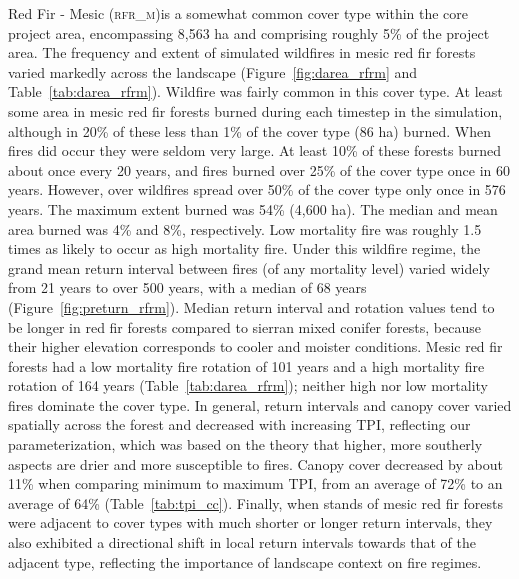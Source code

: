 Red Fir - Mesic (\textsc{rfr\_m})is a somewhat common cover type within the core project area, encompassing 8,563 ha and comprising roughly 5\% of the project area. The frequency and extent of simulated wildfires in mesic red fir forests varied markedly across the landscape (Figure~\ref{fig:darea_rfrm} and Table~\ref{tab:darea_rfrm}). %
%
Wildfire was fairly common in this cover type. At least some area in mesic red fir forests burned during each timestep in the simulation, although in 20\% of these less than 1\% of the cover type (86 ha) burned. When fires did occur they were seldom very large. At least 10\% of these forests burned about once every 20 years, and fires burned over 25\% of the cover type once in 60 years. However, over wildfires spread over 50\% of the cover type only once in 576 years. The maximum extent burned was 54\% (4,600 ha). The median and mean area burned was 4\% and 8\%, respectively. Low mortality fire was roughly 1.5 times as likely to occur as high mortality fire. %
%
Under this wildfire regime, the grand mean return interval between fires (of any mortality level) varied widely from 21 years to over 500 years, with a median of 68 years (Figure~\ref{fig:preturn_rfrm}). Median return interval and rotation values tend to be longer in red fir forests compared to sierran mixed conifer forests, because their higher elevation corresponds to cooler and moister conditions. Mesic red fir forests had a low mortality fire rotation of 101 years and a high mortality fire rotation of 164 years (Table~\ref{tab:darea_rfrm}); neither high nor low mortality fires dominate the cover type.  %
%
In general, return intervals and canopy cover varied spatially across the forest and decreased with increasing TPI, reflecting our parameterization, which was based on the theory that higher, more southerly aspects are drier and more susceptible to fires. Canopy cover decreased by about 11\% when comparing minimum to maximum TPI, from an average of 72\% to an average of 64\% (Table~\ref{tab:tpi_cc}).  %
%
Finally, when stands of mesic red fir forests were adjacent to cover types with much shorter or longer return intervals, they also exhibited a directional shift in local return intervals towards that of the adjacent type, reflecting the importance of landscape context on fire regimes.

